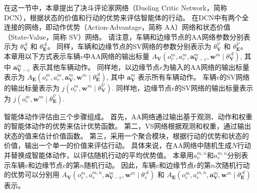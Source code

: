 在这一节中，本章提出了决斗评论家网络（Dueling Critic Network，简称 DCN），根据状态的价值和行动的优势来评估智能体的行动。
在DCN中有两个全连接的网络，即动作优势（Action-Advantage，简称 AA）网络和状态价值（State-Value，简称 SV）网络。
请注意，车辆和边缘节点的AA网络参数分别表示为 $\theta_{\mathbf{V}}^{\mathscr{A}}$ 和 $\theta_{\mathbf{E}}^{\mathscr{A}}$。
同样，车辆和边缘节点的SV网络的参数分别表示为 $\theta_{\mathbf{V}}^{\mathscr{V}}$ 和 $\theta_{\mathbf{E}}^{\mathscr{V}}$。
本章用以下方式表示车辆$v$中AA网络的输出标量 $A_{\mathbf{V}}\left({o}_{v}^{m},  {a}_{v}^{m}, \boldsymbol{a}_{\boldsymbol{\mathbf{V}}-v}^{m}, \boldsymbol{w}^{m} \mid \theta_{\mathbf{V}}^{\mathscr{A}} \right)$, 其中 $\boldsymbol{a}_{\boldsymbol{\mathbf{V}}-v}^{m}$ 表示其他车辆动作。
同样地，以边缘节点$e$为输入的AA网络的输出标量表示为 $A_{\mathbf{E}}\left({o}_{e}^{m},  {a}_{e}^{m}, \boldsymbol{a}_{\boldsymbol{\mathbf{V}}}^{m}, \boldsymbol{w}^{m} \mid \theta_{\mathbf{E}}^{\mathscr{A}} \right)$, 其中 $\boldsymbol{a}_{\boldsymbol{\mathbf{V}}}^{m}$ 表示所有车辆动作。
车辆$v$的SV网络的输出标量表示为 $j\left({o}_{v}^{m}, \boldsymbol{w}^{m} \mid \theta_{\mathbf{V}}^{\mathscr{V}} \right)$. 
同样地，边缘节点$e$的SV网络的输出标量表示为 $j\left({o}_{e}^{m}, \boldsymbol{w}^{m} \mid \theta_{\mathbf{E}}^{\mathscr{V}} \right)$.

智能体动作评估由三个步骤组成。
首先，AA网络通过输出基于观测、动作和权重的智能体动作的优势来估计优势函数。
第二，VS网络根据观测和权重，通过输出状态的值来估计价值函数。
第三，采用一个聚合模块，根据行动的优势和状态的价值，输出一个单一的价值来评估行动。
具体来说，在AA网络中随机生成$N$行动并替换成智能体动作，以评估随机行动的平均优势值。
本章用${a}_{v}^{m, n}$和${a}_{e}^{m, n}$分别表示车辆$v$和边缘节点$e$的第$n$随机行动。
因此，车辆$v$和边缘节点$e$的第$n$次随机行动的优势可以分别用 $A_{\mathbf{V}}\left({o}_{v}^{m},  {a}_{v}^{m, n}, \boldsymbol{a}_{\boldsymbol{\mathbf{V}}-v}^{m}, \boldsymbol{w}^{m} \mid \theta_{v}^{\mathscr{A}} \right)$ 和 $A_{\mathbf{E}}\left({o}_{e}^{m},  {a}_{e}^{m, n}, \boldsymbol{a}_{\boldsymbol{\mathbf{V}}}^{m}, \boldsymbol{w}^{m} \mid \theta_{\mathbf{E}}^{\mathscr{A}} \right)$表示。

